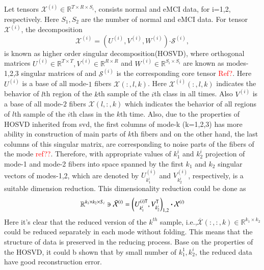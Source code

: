\documentclass[preprint,12pt]{elsarticle}
\begin{document}
Let tensors $\mathcal{X}^{(i)}\in \mathbb{R}^{T\times R \times S_i}$, consists normal and eMCI data, for i=1,2, respectively.  Here $S_1,S_2$ are the number of normal and eMCI data.
For tensor $\mathcal{X}^{(i)}$, the decomposition
\begin{equation}
\label{ho}
\mathcal{X}^{(i)} = 
\left(  
U^{(i)},V^{(i)},W^{(i)}
\right)\boldsymbol{\cdot} \mathcal{S}^{(i)},
\end{equation}
is known as higher order singular decomposition(HOSVD),
where orthogonal matrices $U^{(i)}\in \mathbb{R}^{T\times T}, V^{(i)}\in \mathbb{R}^{R\times R} $ and $W^{(i)}\in \mathbb{R}^{S_i\times S_i}$ are known as modes-1,2,3 singular matrices of 
and $\mathcal{S}^{(i)}$ is the corresponding core tensor \textcolor{red}{Ref?}. Here $U^{(i)}$ is a base of all mode-$ 1 $ fibers $\mathcal{X}(:,l,k)$. Here  $\mathcal{X}^{(i)}(:,l,k)$ indicates the behavior of $l$th region of the $k$th sample of the $i$th class in all times. Also  $V^{(i)}$ is a base of all mode-$ 2 $ fibers $\mathcal{X}(l,:,k)$ which indicates the behavior of all regions of  $l$th  sample of the $i$th class in  the $k$th time.
Also, due to the properties of HOSVD inherited from svd, the first columns of mode-k (k=1,2,3) has more ability in construction of main parts of $k$th fibers and on the other hand, the last columns of  this singular matrix, are corresponding to noise parts of the fibers of the mode \textcolor{red}{ref??}. Therefore, with appropriate values of $k^i_1$ and $k^i_2$ projection of mode-1 and mode-2 fibers into space spanned by  the first $k_1$ and $k_2$ singular vectors of modes-1,2, which  are denoted by  $U^{(i)}_{k^i_1}$ and $V_{k^i_2}^{(i)}$, respectively,
is a suitable  dimension reduction. This dimensionality reduction could be done as
\begin{align}
\label{m1}
\mathbb{R}^{k_1 \times k_2 \times S_i} \ni  \bar{{\mathcal{X}}}^{(i)} = \left( 
U^{(i) {\sf {T}}}_{k^i_1}, V_{k^i_2}^{\sf {T}}
\right)_{1,2}\boldsymbol{\cdot} \mathcal{X}^{(i)}
\end{align}
Here it's clear that the reduced version of the $k^{th}$ sample, i.e.,$\overline{\mathcal{X}}(:,:,k)\in \mathbb{R}^{k_1\times k_2}$ could be reduced separately  in each mode without folding. This means that the structure of data is preserved in the reducing process.
Base on the properties of the  HOSVD, it could b shown that by small number of $k_1^1, k_2^i$, the reduced data have good reconstruction error. 
\end{document}
